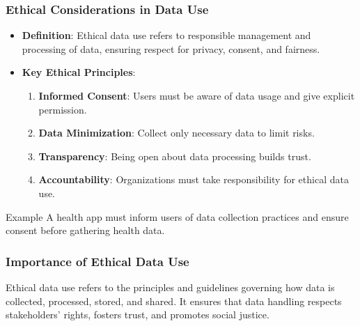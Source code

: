 \documentclass[aspectratio=169]{beamer}
\begin{document}
\begin{frame}[fragile]
    \frametitle{Ethical Considerations in Data Use}
    \begin{itemize}
        \item \textbf{Definition}: Ethical data use refers to responsible management and processing of data, ensuring respect for privacy, consent, and fairness.
        \item \textbf{Key Ethical Principles}:
        \begin{enumerate}
            \item \textbf{Informed Consent}: Users must be aware of data usage and give explicit permission.
            \item \textbf{Data Minimization}: Collect only necessary data to limit risks.
            \item \textbf{Transparency}: Being open about data processing builds trust.
            \item \textbf{Accountability}: Organizations must take responsibility for ethical data use.
        \end{enumerate}
    \end{itemize}
    \begin{block}{Example}
        A health app must inform users of data collection practices and ensure consent before gathering health data.
    \end{block}
\end{frame}

\begin{frame}[fragile]
    \frametitle{Importance of Ethical Data Use}
    Ethical data use refers to the principles and guidelines governing how data is collected, processed, stored, and shared. 
    It ensures that data handling respects stakeholders’ rights, fosters trust, and promotes social justice.
\end{frame}
\end{document}
